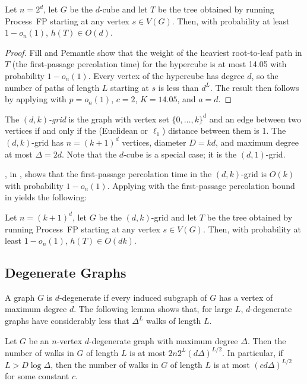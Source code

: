 \documentclass{patmorin}
\begin{document}
\begin{thm}
  Let $n=2^d$, let $G$ be the $d$-cube and let $T$ be the tree obtained
  by running Process~FP starting at any vertex $s\in V(G)$.  Then,
  with probability at least $1-o_n(1)$, $h(T)\in O(d)$.
\end{thm}

\begin{proof}
  Fill and Pemantle \cite{fill.pemantle:percolation} show that the weight of
  the heaviest root-to-leaf path in $T$ (the first-passage percolation
  time) for the hypercube is at most 14.05 with probability $1-o_n(1)$.
  Every vertex of the hypercube has degree $d$, so the number of paths
  of length $L$ starting at $s$ is less than $d^L$.  The result then follows
  by applying  with $p=o_n(1)$, $c=2$, $K=14.05$,
  and $a=d$.
\end{proof}

The \emph{$(d,k)$-grid} is the graph with vertex set $\{0,\ldots,k\}^d$
and an edge between two vertices if and only if the (Euclidean or
$\ell_1$) distance between them is 1.  The $(d,k)$-grid has $n=(k+1)^d$
vertices, diameter $D=kd$, and maximum degree at most $\Delta=2d$. Note
that the $d$-cube is a special case; it is the $(d,1)$-grid.

, in , shows that
the first-passage percolation time in the $(d,k)$-grid is $O(k)$ with
probability $1-o_n(1)$.  Applying  with 
the first-passage percolation bound in  yields
the following:

\begin{cor}
  Let $n=(k+1)^d$, let $G$ be the $(d,k)$-grid and let $T$ be the tree obtained
  by running Process~FP starting at any vertex $s\in V(G)$.  Then,
  with probability at least $1-o_n(1)$, $h(T)\in O(dk)$.
\end{cor}

\subsection{Degenerate Graphs}

A graph $G$ is $d$-degenerate if every induced subgraph of $G$ has
a vertex of maximum degree $d$.  The following lemma shows that, for
large $L$, $d$-degenerate graphs have considerably less that $\Delta^L$
walks of length $L$.

\begin{lem}
   Let $G$ be an $n$-vertex $d$-degenerate graph with maximum degree
   $\Delta$.  Then the number of walks in $G$ of length $L$ is at most
   $2n2^{L}(d\Delta)^{L/2}$.  In particular, if $L > D\log\Delta$, then
   the number of walks in $G$ of length $L$ is at most $(cd\Delta)^{L/2}$
   for some constant $c$.
\end{lem}
\end{document}
